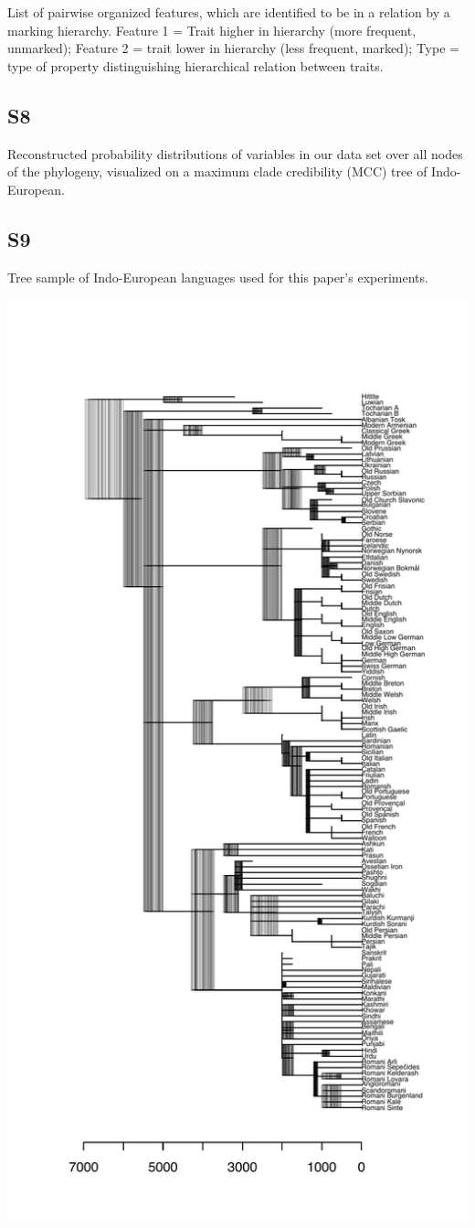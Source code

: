 \documentclass[12pt]{article}
\begin{document}
List of pairwise organized features, which are identified to be in a relation by a marking hierarchy. Feature 1 = Trait higher in hierarchy (more frequent, unmarked); 
Feature 2 = trait lower in hierarchy (less frequent, marked); 
Type = type of property distinguishing hierarchical relation between traits.



\break

\subsection*{S8}

Reconstructed probability distributions of variables in our data set over all nodes of the phylogeny, visualized on a maximum clade credibility (MCC) tree of Indo-European.




\subsection*{S9}

Tree sample of Indo-European languages used for this paper's experiments.

\includegraphics[width=.7\linewidth]{tree-sample.pdf}
\end{document}
